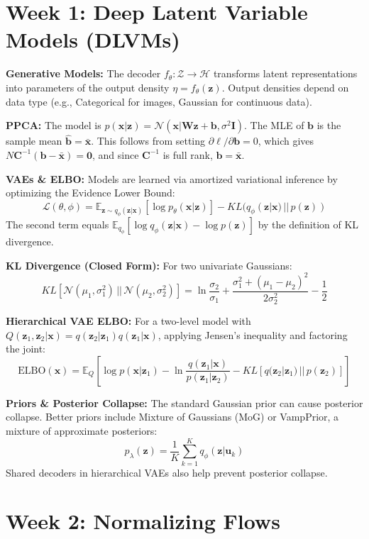 \documentclass[12pt]{article}
\begin{document}
\section*{Week 1: Deep Latent Variable Models (DLVMs)}

\textbf{Generative Models:} The decoder $f_\theta: \mathcal{Z} \to \mathcal{H}$ transforms latent representations into parameters of the output density $\eta = f_\theta(\bm{z})$. Output densities depend on data type (e.g., Categorical for images, Gaussian for continuous data).

\textbf{PPCA:} The model is $p(\bm{x}|\bm{z}) = \mathcal{N}(\bm{x}|\bm{W}\bm{z} + \bm{b}, \sigma^2 \bm{I})$. The MLE of $\bm{b}$ is the sample mean $\hat{\bm{b}} = \bar{\bm{x}}$. This follows from setting $\partial \ell / \partial \bm{b} = 0$, which gives $N\bm{C}^{-1}(\bm{b} - \bar{\bm{x}}) = \bm{0}$, and since $\bm{C}^{-1}$ is full rank, $\bm{b} = \bar{\bm{x}}$.

\textbf{VAEs \& ELBO:} Models are learned via amortized variational inference by optimizing the Evidence Lower Bound:
\[
\mathcal{L}(\theta, \phi) = \mathbb{E}_{\bm{z}\sim q_\phi(\bm{z}|\bm{x})}[\log p_\theta(\bm{x}|\bm{z})] - KL(q_\phi(\bm{z}|\bm{x}) \,||\, p(\bm{z}))
\]
The second term equals $\mathbb{E}_{q_\phi}[\log q_\phi(\bm{z}|\bm{x}) - \log p(\bm{z})]$ by the definition of KL divergence.

\textbf{KL Divergence (Closed Form):} For two univariate Gaussians:
\[
KL[\mathcal{N}(\mu_1, \sigma_1^2) \,||\, \mathcal{N}(\mu_2, \sigma_2^2)] = \ln\frac{\sigma_2}{\sigma_1} + \frac{\sigma_1^2 + (\mu_1 - \mu_2)^2}{2\sigma_2^2} - \frac{1}{2}
\]

\textbf{Hierarchical VAE ELBO:} For a two-level model with $Q(\bm{z}_1, \bm{z}_2|\bm{x}) = q(\bm{z}_2|\bm{z}_1)q(\bm{z}_1|\bm{x})$, applying Jensen's inequality and factoring the joint:
\[
\text{ELBO}(\bm{x}) = \mathbb{E}_{Q}\!\left[\log p(\bm{x}|\bm{z}_1) - \ln\frac{q(\bm{z}_1|\bm{x})}{p(\bm{z}_1|\bm{z}_2)} - KL[q(\bm{z}_2|\bm{z}_1) \,||\, p(\bm{z}_2)]\right]
\]

\textbf{Priors \& Posterior Collapse:} The standard Gaussian prior can cause posterior collapse. Better priors include Mixture of Gaussians (MoG) or VampPrior, a mixture of approximate posteriors:
\[
p_\lambda(\bm{z}) = \frac{1}{K}\sum_{k=1}^{K} q_\phi(\bm{z}|\bm{u}_k)
\]
Shared decoders in hierarchical VAEs also help prevent posterior collapse.

\section*{Week 2: Normalizing Flows}
\end{document}
